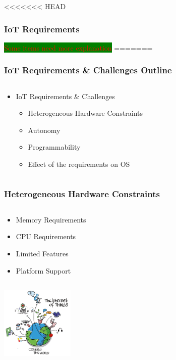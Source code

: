 \documentclass{beamer}
\begin{document}
\begin{frame}
<<<<<<< HEAD
	\frametitle{IoT Requirements}
	\colorbox{green}{\textcolor{red}{Some items need more explanation}}
=======
	\frametitle{IoT Requirements \& Challenges Outline}
	\begin{columns}[c]
		\begin{column}{30cm}
			\vspace{.1cm}
			\begin{itemize}
				\justifying
				\item IoT Requirements \& Challenges
				\begin{itemize}
					\item Heterogeneous Hardware Constraints
					\item Autonomy 
					\item Programmability
					\item Effect of the requirements on OS
				\end{itemize}
			\end{itemize}
		\end{column}
	\end{columns}
\end{frame}

\begin{frame}
	\frametitle{Heterogeneous Hardware Constraints}
	\begin{columns}[c]
		\begin{column}{30cm}
			\vspace{.1cm}
			\begin{itemize}
				\justifying
				\item Memory Requirements
				\item CPU Requirements
				\item Limited Features
				\item Platform Support
			\end{itemize}
		\end{column}
	\end{columns}
	\hspace*{7cm} \includegraphics[width=3.5cm]{figs/Internet-of-Things-3.jpg}
\end{frame}
\end{document}
